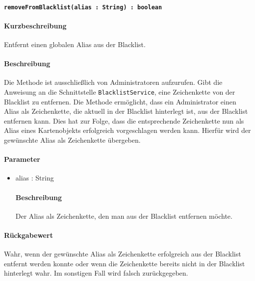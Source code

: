 \paragraph{\texttt{removeFromBlacklist(alias : String) : boolean}}%
\paragraph*{Kurzbeschreibung}
Entfernt einen globalen Alias aus der Blacklist.
\paragraph*{Beschreibung}
Die Methode ist ausschließlich von Administratoren aufzurufen.
Gibt die Anweisung an die Schnittstelle \texttt{BlacklistService}, eine Zeichenkette von der Blacklist zu entfernen.
Die Methode ermöglicht, dass ein Administrator einen Alias als Zeichenkette, die aktuell in der Blacklist hinterlegt ist, aus der Blacklist entfernen kann.
Dies hat zur Folge, dass die entsprechende Zeichenkette nun als Alias eines Kartenobjekts erfolgreich vorgeschlagen werden kann.
Hierfür wird der gewünschte Alias als Zeichenkette übergeben.
\paragraph*{Parameter}
\begin{itemize}
    \item alias : String
    		\paragraph*{Beschreibung}
    		Der Alias als Zeichenkette, den man aus der Blacklist entfernen möchte.
\end{itemize}
\paragraph*{Rückgabewert}
Wahr, wenn der gewünschte Alias als Zeichenkette erfolgreich aus der Blacklist entfernt werden konnte oder wenn die Zeichenkette bereits nicht in der Blacklist hinterlegt wahr. Im sonstigen Fall wird falsch zurückgegeben.
